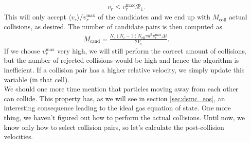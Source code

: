 \begin{align}
	v_r \leq v_r^\text{max}\mathcal{R}_1.
\end{align}
This will only accept $\langle v_r\rangle/v_r^\text{max}$ of the candidates and we end up with $M_\text{coll}$ actual collisions, as desired. The number of candidate pairs is then computed as
\begin{align}
	M_\text{cand} = \frac{N_c(N_c-1)N_\text{eff}\pi d^2v_r^\text{max} \Delta t}{2V_c}.
\end{align}
If we choose $v_r^\text{max}$ very high, we will still perform the correct amount of collisions, but the number of rejected collisions would be high and hence the algorithm is inefficient. If a collision pair has a higher relative velocity, we simply update this variable (in that cell).\\
We should one more time mention that particles moving away from each other can collide. This property has, as we will see in section \ref{sec:dsmc_eos}, an interesting consequence leading to the ideal gas equation of state. One more thing, we haven't figured out how to perform the actual collisions. Until now, we know only how to select collision pairs, so let's calculate the post-collision velocities.
